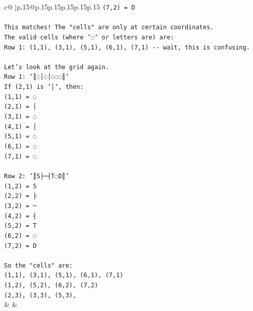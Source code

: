 \documentclass{article}
\begin{document}
{\begin{supertabular}{c@{$\;$}|p{.15\linewidth}@{}p{.15\linewidth}p{.15\linewidth}p{.15\linewidth}p{.15\linewidth}p{.15\linewidth}}
{{{\texttt{(7,2) = D} \\
\\ 
\texttt{This matches! The "cells" are only at certain coordinates.} \\
\texttt{The valid cells (where `◌` or letters are) are:} \\
\texttt{Row 1: (1,1), (3,1), (5,1), (6,1), (7,1) {-}{-} wait, this is confusing.} \\
\\ 
\texttt{Let's look at the grid again.} \\
\texttt{Row 1: `║◌│◌│◌◌◌║`} \\
\texttt{If (2,1) is `│`, then:} \\
\texttt{(1,1) = ◌} \\
\texttt{(2,1) = │} \\
\texttt{(3,1) = ◌} \\
\texttt{(4,1) = │} \\
\texttt{(5,1) = ◌} \\
\texttt{(6,1) = ◌} \\
\texttt{(7,1) = ◌} \\
\\ 
\texttt{Row 2: `║S├─┤T◌D║`} \\
\texttt{(1,2) = S} \\
\texttt{(2,2) = ├} \\
\texttt{(3,2) = ─} \\
\texttt{(4,2) = ┤} \\
\texttt{(5,2) = T} \\
\texttt{(6,2) = ◌} \\
\texttt{(7,2) = D} \\
\\ 
\texttt{So the "cells" are:} \\
\texttt{(1,1), (3,1), (5,1), (6,1), (7,1)} \\
\texttt{(1,2), (5,2), (6,2), (7,2)} \\
\texttt{(2,3), (3,3), (5,3),} \\
            }
        }
    }
    & & \\ \\


\end{supertabular}}
\end{document}
